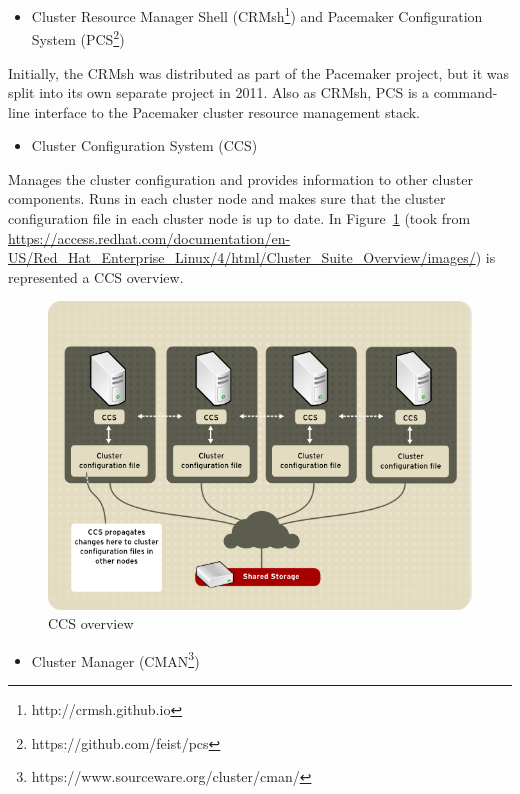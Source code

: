 \documentclass[a4paper, 12pt]{book}
\begin{document}
\begin{itemize}
	\item Cluster Resource Manager Shell (CRMsh\footnote{http://crmsh.github.io}) and Pacemaker Configuration System (PCS\footnote{https://github.com/feist/pcs})
\end{itemize}

\noindent Initially, the CRMsh was distributed as part of the Pacemaker project, but it was split into its own separate project in 2011. Also as CRMsh, PCS is a command-line interface to the Pacemaker cluster resource management stack.

\begin{itemize}
	\item Cluster Configuration System (CCS)
\end{itemize}

\noindent Manages the cluster configuration and provides information to other cluster components. Runs in each cluster node and makes sure that the cluster configuration file in each cluster node is up to date. In Figure~\ref{fig:ccs} (\small {took from \url{https://access.redhat.com/documentation/en-US/Red_Hat_Enterprise_Linux/4/html/Cluster_Suite_Overview/images/}}) is represented a CCS overview.

\begin{figure}[H]
  \centering
  \includegraphics[scale=0.50]{ccs-overview.png}
  \caption[CCS overview]{CCS overview}
  \label{fig:ccs}
\end{figure}

\begin{itemize}
	\item Cluster Manager (CMAN\footnote{https://www.sourceware.org/cluster/cman/})
\end{itemize}
\end{document}
